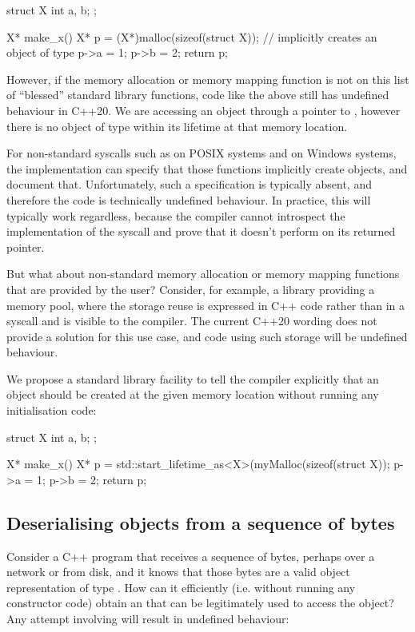\begin{codeblock}
struct X { int a, b; };

X* make_x() {
  X* p = (X*)malloc(sizeof(struct X)); // implicitly creates an object of type 
  p->a = 1;
  p->b = 2;
  return p;
}
\end{codeblock}

However, if the memory allocation or memory mapping function is not on this list of ``blessed'' standard library functions, code like the above still has undefined behaviour in C++20. We are accessing an object through a pointer to , however there is no object of type  within its lifetime at that memory location.

For non-standard syscalls such as  on POSIX systems and  on Windows systems, the implementation can specify that those functions implicitly create objects, and document that. Unfortunately, such a specification is typically absent, and therefore the code is technically undefined behaviour. In practice, this will typically work regardless, because the compiler cannot introspect the implementation of the syscall and prove that it doesn't perform  on its returned pointer.

But what about non-standard memory allocation or memory mapping functions that are provided by the user? Consider, for example, a library providing a memory pool, where the storage reuse is expressed in C++ code rather than in a syscall and is visible to the compiler. The current C++20 wording does not provide a solution for this use case, and code using such storage will be undefined behaviour.

We propose a standard library facility \mbox{} to tell the compiler explicitly that an object should be created at the given memory location without running any initialisation code:

\begin{codeblock}
struct X { int a, b; };

X* make_x() {
  X* p = std::start_lifetime_as<X>(myMalloc(sizeof(struct X));
  p->a = 1;
  p->b = 2;
  return p;
}
\end{codeblock}

\subsection{Deserialising objects from a sequence of bytes}

Consider a C++ program that receives a sequence of bytes, perhaps over a network or from disk, and it knows that those bytes are a valid object representation of type . How can it efficiently (i.e. without running any constructor code) obtain an  that can be legitimately used to access the object? Any attempt involving  will result in undefined behaviour:

